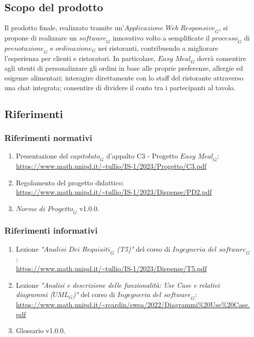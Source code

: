 \documentclass[12pt, oneside]{article}
\begin{document}
\subsection{Scopo del prodotto}
Il prodotto finale, realizzato tramite un'$\textit{Applicazione Web Responsive}_G$, si propone di realizzare un $\textit{software}_G$ innovativo volto a semplificate il $\textit{processo}_G$ di $\textit{prenotazione}_G$ e $\textit{ordinazione}_G$ nei ristoranti, contribuendo a migliorare l'esperienza per clienti e ristoratori. In particolare, $\textit{Easy Meal}_G$ dovrà consentire agli utenti di personalizzare gli ordini in base alle proprie preferenze, allergie ed esigenze alimentari; interagire direttamente con lo staff del ristorante attraverso una chat integrata; consentire di dividere il conto tra i partecipanti al tavolo.
\subsection{Riferimenti}
\subsubsection{Riferimenti normativi}
\begin{enumerate}
    \item Presentazione del $\textit{capitolato}_G$ d'appalto C3 - Progetto $\textit{Easy Meal}_G$: \\ \url{https://www.math.unipd.it/~tullio/IS-1/2023/Progetto/C3.pdf}
    \item Regolamento del progetto didattico: \\ \url{https://www.math.unipd.it/~tullio/IS-1/2023/Dispense/PD2.pdf}
    \item $\textit{Norme di Progetto}_G$ v1.0.0.
\end{enumerate}
\subsubsection{Riferimenti informativi}
\begin{enumerate}
    \item Lezione \emph{"$\textit{Analisi Dei Requisiti}_G$ (T5)"} del corso di $\textit{Ingegneria del software}_G$: \\ \url{https://www.math.unipd.it/~tullio/IS-1/2023/Dispense/T5.pdf}
    \item Lezione \emph{"Analisi e descrizione delle funzionalità: Use Case e relativi diagrammi ($\textit{UML}_G$)"} del corso di $\textit{Ingegneria del software}_G$: \\ \url{https://www.math.unipd.it/~rcardin/swea/2022/Diagrammi%20Use%20Case.pdf}
    \item Glossario v1.0.0.
\end{enumerate}
\newpage
\end{document}
